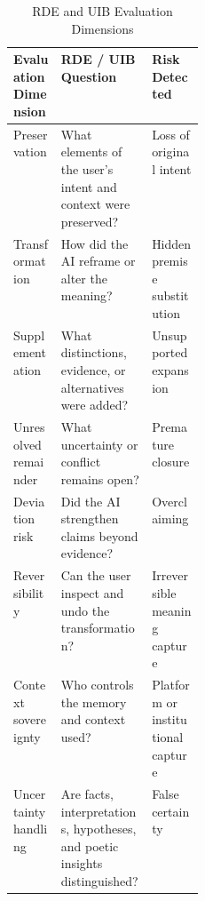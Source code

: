 \begin{table}[htbp]
\centering
\caption{RDE and UIB Evaluation Dimensions}
\label{tab:rde-uib-dimensions}
\begin{tabularx}{\linewidth}{>{\raggedright\arraybackslash}p{0.25\linewidth}XX}
\toprule
\textbf{Evaluation Dimension} & \textbf{RDE / UIB Question} & \textbf{Risk Detected} \\
\midrule
Preservation & What elements of the user's intent and context were preserved? & Loss of original intent \\
Transformation & How did the AI reframe or alter the meaning? & Hidden premise substitution \\
Supplementation & What distinctions, evidence, or alternatives were added? & Unsupported expansion \\
Unresolved remainder & What uncertainty or conflict remains open? & Premature closure \\
Deviation risk & Did the AI strengthen claims beyond evidence? & Overclaiming \\
Reversibility & Can the user inspect and undo the transformation? & Irreversible meaning capture \\
Context sovereignty & Who controls the memory and context used? & Platform or institutional capture \\
Uncertainty handling & Are facts, interpretations, hypotheses, and poetic insights distinguished? & False certainty \\
\bottomrule
\end{tabularx}
\end{table}
